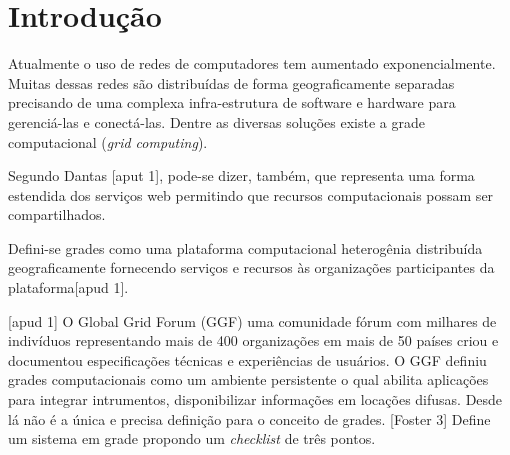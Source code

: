 \section*{Introdução}
\label{cap:introducao}

Atualmente o uso de redes de computadores tem aumentado exponencialmente. Muitas dessas redes são distribuídas de forma geograficamente separadas precisando de uma complexa infra-estrutura de software e hardware para gerenciá-las e conectá-las. Dentre as diversas soluções existe a grade computacional (\emph{grid computing}).

Segundo Dantas [aput 1], pode-se dizer, também, que representa uma forma estendida dos serviços web permitindo que recursos computacionais possam ser compartilhados.

Defini-se grades como uma plataforma computacional heterogênia distribuída geograficamente fornecendo serviços e recursos às organizações participantes da plataforma[apud 1].

[apud 1] O Global Grid Forum (GGF) uma comunidade fórum com milhares de indivíduos representando mais de 400 organizações em mais de 50 países criou e documentou especificações técnicas e experiências de usuários. O GGF definiu grades computacionais como um ambiente persistente o qual abilita aplicações para integrar intrumentos, disponibilizar informações em locações difusas. Desde lá não é a única e precisa definição para o conceito de grades. [Foster 3] Define um sistema em grade propondo um \emph{checklist} de três pontos.
